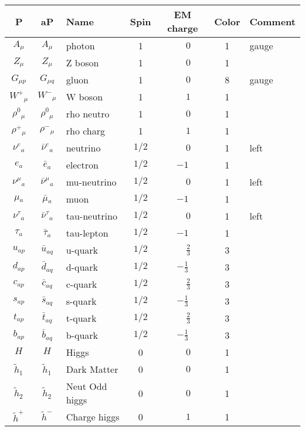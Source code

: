 \begin{tabular}{|cc|l|c|c|c|l|} \hline
P & aP & Name & Spin  & EM charge & Color & Comment \\ \hline
$A_{\mu }$&$A_{\mu }$&photon        &1           & $\phantom{-}0$ &1    &gauge\\
$Z_{\mu }$&$Z_{\mu }$&Z boson       &1           & $\phantom{-}0$ &1    &   \\
$G_{\mu p}$&$G_{\mu q}$&gluon         &1           & $\phantom{-}0$ &8    &gauge\\
$W^+{}_{\mu }$&$W^-{}_{\mu }$&W boson       &1           &$\phantom{-}1$ &1    &   \\
$\rho^0{}_{\mu }$&$\rho^0{}_{\mu }$&rho neutro    &1           & $\phantom{-}0$ &1    &   \\
$\rho^+{}_{\mu }$&$\rho^-{}_{\mu }$&rho charg     &1           &$\phantom{-}1$ &1    &   \\
$\nu^e{}_{a}$&$\bar{\nu}^e{}_{a}$&neutrino      &$1/2$       & $\phantom{-}0$ &1    &left\\
$e{}_{a}$ &$\bar{e}{}_{a}$&electron      &$1/2$       &$-1$ &1    &   \\
$\nu^\mu{}_{a}$&$\bar{\nu}^\mu{}_{a}$&mu-neutrino   &$1/2$       & $\phantom{-}0$ &1    &left\\
$\mu{}_{a}$&$\bar{\mu}{}_{a}$&muon          &$1/2$       &$-1$ &1    &   \\
$\nu^\tau{}_{a}$&$\bar{\nu}^\tau{}_{a}$&tau-neutrino  &$1/2$       & $\phantom{-}0$ &1    &left\\
$\tau{}_{a}$&$\bar{\tau}{}_{a}$&tau-lepton    &$1/2$       &$-1$ &1    &   \\
$u{}_{ap}$&$\bar{u}{}_{aq}$&u-quark       &$1/2$       &$\phantom{-}\frac{2}{3}$ &3    &   \\
$d{}_{ap}$&$\bar{d}{}_{aq}$&d-quark       &$1/2$       &$-\frac{1}{3}$ &3    &   \\
$c{}_{ap}$&$\bar{c}{}_{aq}$&c-quark       &$1/2$       &$\phantom{-}\frac{2}{3}$ &3    &   \\
$s{}_{ap}$&$\bar{s}{}_{aq}$&s-quark       &$1/2$       &$-\frac{1}{3}$ &3    &   \\
$t{}_{ap}$&$\bar{t}{}_{aq}$&t-quark       &$1/2$       &$\phantom{-}\frac{2}{3}$ &3    &   \\
$b{}_{ap}$&$\bar{b}{}_{aq}$&b-quark       &$1/2$       &$-\frac{1}{3}$ &3    &   \\
$H_{}$    &$H_{}$    &Higgs         &0           & $\phantom{-}0$ &1    &   \\
$\widetilde{h}_1{}_{}$&$\widetilde{h}_1{}_{}$&Dark Matter   &0           & $\phantom{-}0$ &1    &   \\
$\widetilde{h}_2{}_{}$&$\widetilde{h}_2{}_{}$&Neut Odd higgs &0           & $\phantom{-}0$ &1    &   \\
$\widetilde{h}^+{}_{}$&$\widetilde{h}^-{}_{}$&Charge higgs  &0           &$\phantom{-}1$ &1    &   \\ \hline
\end{tabular}
